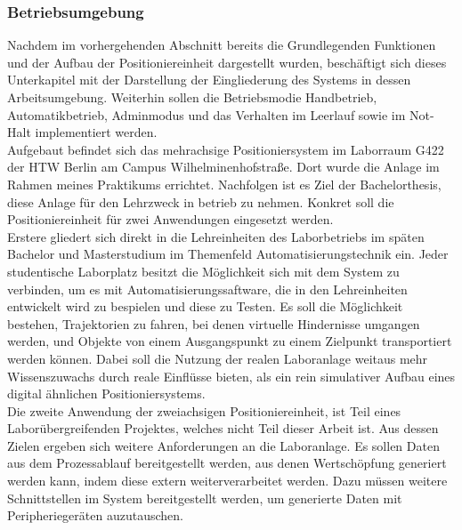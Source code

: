 \documentclass[../Bachelorarbeit.tex]{subfiles}
\begin{document}
\subsubsection{Betriebsumgebung}
Nachdem im vorhergehenden Abschnitt bereits die Grundlegenden Funktionen und der Aufbau der Positioniereinheit dargestellt wurden, beschäftigt sich dieses Unterkapitel mit der Darstellung der Eingliederung des Systems in dessen Arbeitsumgebung. Weiterhin sollen die Betriebsmodie \glqq Handbetrieb\grqq{}, \glqq Automatikbetrieb\grqq{}, \glqq Adminmodus\grqq{} und das Verhalten im Leerlauf sowie im Not-Halt implementiert werden.\\
Aufgebaut befindet sich das mehrachsige Positioniersystem im Laborraum G422 der HTW Berlin am Campus Wilhelminenhofstraße. Dort wurde die Anlage im Rahmen meines Praktikums errichtet. Nachfolgen ist es Ziel der Bachelorthesis, diese Anlage für den Lehrzweck in betrieb zu nehmen. Konkret soll die Positioniereinheit für zwei Anwendungen eingesetzt werden.\\
Erstere gliedert sich direkt in die Lehreinheiten des Laborbetriebs im späten Bachelor und Masterstudium im Themenfeld Automatisierungstechnik ein. Jeder studentische Laborplatz besitzt die Möglichkeit sich mit dem System zu verbinden, um es mit Automatisierungssaftware, die in den Lehreinheiten entwickelt wird zu bespielen und diese zu Testen. Es soll die Möglichkeit bestehen, Trajektorien zu fahren, bei denen virtuelle Hindernisse umgangen werden, und Objekte von einem Ausgangspunkt zu einem Zielpunkt transportiert werden können. Dabei soll die Nutzung der realen Laboranlage weitaus mehr Wissenszuwachs durch reale Einflüsse bieten, als ein rein simulativer Aufbau eines digital ähnlichen Positioniersystems.\\
Die zweite Anwendung der zweiachsigen Positioniereinheit, ist Teil eines Laborübergreifenden Projektes, welches nicht Teil dieser Arbeit ist. Aus dessen Zielen ergeben sich weitere Anforderungen an die Laboranlage. Es sollen Daten aus dem Prozessablauf bereitgestellt werden, aus denen Wertschöpfung generiert werden kann, indem diese extern weiterverarbeitet werden. Dazu müssen weitere Schnittstellen im System bereitgestellt werden, um generierte Daten mit Peripheriegeräten auzutauschen.
\end{document}
